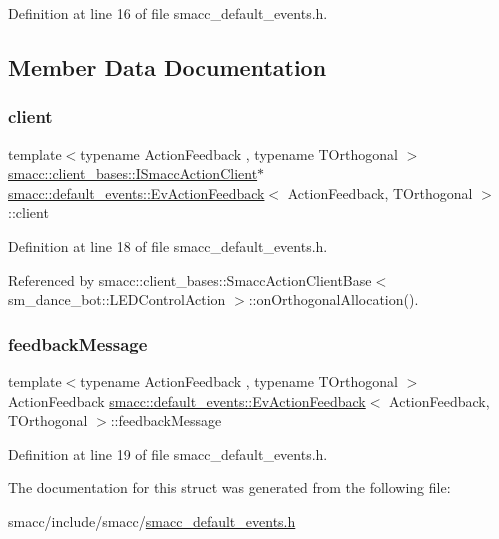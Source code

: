 Definition at line 16 of file smacc\+\_\+default\+\_\+events.\+h.



\subsection{Member Data Documentation}
\mbox{\label{structsmacc_1_1default__events_1_1EvActionFeedback_ab8b19361505d9bbf3fd7a9fbd89f6194}} 
\subsubsection{\texorpdfstring{client}{client}}
{\footnotesize\ttfamily template$<$typename Action\+Feedback , typename T\+Orthogonal $>$ \\
\hyperlink{classsmacc_1_1client__bases_1_1ISmaccActionClient}{smacc\+::client\+\_\+bases\+::\+I\+Smacc\+Action\+Client}$\ast$ \hyperlink{structsmacc_1_1default__events_1_1EvActionFeedback}{smacc\+::default\+\_\+events\+::\+Ev\+Action\+Feedback}$<$ Action\+Feedback, T\+Orthogonal $>$\+::client}



Definition at line 18 of file smacc\+\_\+default\+\_\+events.\+h.



Referenced by smacc\+::client\+\_\+bases\+::\+Smacc\+Action\+Client\+Base$<$ sm\+\_\+dance\+\_\+bot\+::\+L\+E\+D\+Control\+Action $>$\+::on\+Orthogonal\+Allocation().

\mbox{\label{structsmacc_1_1default__events_1_1EvActionFeedback_ac66d20a4452379d02e5ef6674d7b2f72}} 
\subsubsection{\texorpdfstring{feedback\+Message}{feedbackMessage}}
{\footnotesize\ttfamily template$<$typename Action\+Feedback , typename T\+Orthogonal $>$ \\
Action\+Feedback \hyperlink{structsmacc_1_1default__events_1_1EvActionFeedback}{smacc\+::default\+\_\+events\+::\+Ev\+Action\+Feedback}$<$ Action\+Feedback, T\+Orthogonal $>$\+::feedback\+Message}



Definition at line 19 of file smacc\+\_\+default\+\_\+events.\+h.



The documentation for this struct was generated from the following file\+:\begin{DoxyCompactItemize}
\item 
smacc/include/smacc/\hyperlink{smacc__default__events_8h}{smacc\+\_\+default\+\_\+events.\+h}\end{DoxyCompactItemize}
